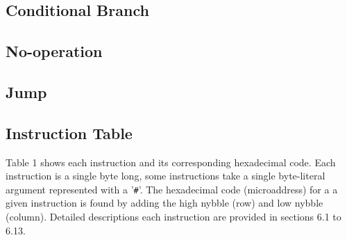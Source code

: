 \documentclass[a4paper,12pt]{article}
\begin{document}
\subsection{Conditional Branch}
\subsection{No-operation}
\subsection{Jump}
\subsection{Instruction Table}
Table 1 shows each instruction and its corresponding hexadecimal code. Each
instruction is a single byte long, some instructions take a single byte-literal 
argument represented with a '\texttt{\#}'. The hexadecimal code (microaddress) 
for a a given instruction is found by adding the high nybble (row) and low 
nybble (column). Detailed descriptions each instruction are provided in 
sections 6.1 to 6.13.
\par
\end{document}
